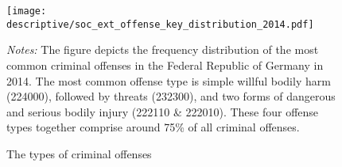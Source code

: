 


\vspace*{\fill}
\begin{figure}[H]\centering
	\caption{The types of criminal offenses}\label{fig_soc_ext:offense_types_distribution_2014}
	\texttt{[image: descriptive/soc\_ext\_offense\_key\_distribution\_2014.pdf]}
	\begin{minipage}{0.95\linewidth}
		\scriptsize{\emph{Notes:} The figure depicts the frequency distribution of the most common criminal offenses in the Federal Republic of Germany in 2014. The most common offense type is simple willful bodily harm (224000), followed by threats (232300), and two forms of dangerous and serious bodily injury (222110 \& 222010). These four offense types together comprise around 75\% of all criminal offenses.}
	\end{minipage}
\end{figure}
\vspace*{\fill}\clearpage

